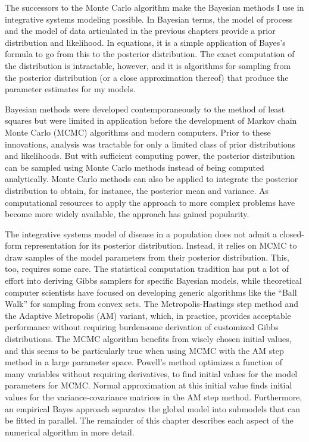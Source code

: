 The successors to the Monte Carlo algorithm make the
Bayesian methods I use in integrative systems modeling possible.  In
Bayesian terms, the model of process and the model of data articulated in
the previous chapters provide a prior distribution and
likelihood.  In equations, it is a simple application of Bayes's
formula to go from this to the posterior distribution.  The exact
computation of the distribution is intractable, however, and it is
algorithms for sampling from the posterior distribution (or a close
approximation thereof) that produce the parameter estimates for my
models.

Bayesian methods were developed contemporaneously to the method of
least squares but were limited in application before the development
of Markov chain Monte Carlo (MCMC) algorithms and modern computers.
Prior to these innovations, analysis was tractable for only a limited
class of prior distributions and likelihoods. But with sufficient
computing power, the posterior distribution can be sampled using Monte
Carlo methods instead of being computed
analytically.\cite{gelman_bayesian_2003} Monte Carlo methods can also
be applied to integrate the posterior distribution to obtain, for
instance, the posterior mean and variance. As computational resources
to apply the approach to more complex problems have become more widely
available, the approach has gained popularity.\cite{tanner_em_2010}

The integrative systems model of disease in a population does not admit
a closed-form representation for its posterior distribution.  Instead,
it relies on MCMC to draw samples of the model parameters from their
posterior distribution.  This, too, requires some care.  The
statistical computation tradition has put a lot of effort into
deriving Gibbs samplers for specific Bayesian models, while
theoretical computer scientists have focused on developing generic
algorithms like the ``Ball Walk'' for sampling from convex sets.  
The Metropolis-Hastings step method and the Adaptive Metropolis (AM)
variant,\cite{haario_adaptive_2001} which, in practice, provides
acceptable performance without requiring burdensome derivation of
customized Gibbs distributions. The MCMC algorithm benefits from
wisely chosen initial values, and this seems to be particularly true
when using MCMC with the AM step method in a large parameter space. 
Powell's method optimizes a function of many variables
without requiring derivatives, to find initial values for the model
parameters for MCMC.\cite{powell_efficient_1964}  Normal approximation at this initial
value finds initial values for the variance-covariance matrices in
the AM step method.  Furthermore, an empirical Bayes
approach separates the global model into submodels that can be fitted
in parallel.  The remainder of this chapter describes each aspect of
the numerical algorithm in more detail.

